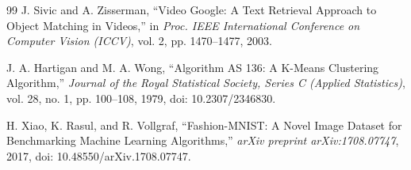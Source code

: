 \begin{thebibliography}{99}
J. Sivic and A. Zisserman,
``Video Google: A Text Retrieval Approach to Object Matching in Videos,''
in \textit{Proc. IEEE International Conference on Computer Vision (ICCV)},
vol. 2, pp. 1470--1477, 2003.

J. A. Hartigan and M. A. Wong,
``Algorithm AS 136: A K-Means Clustering Algorithm,''
\textit{Journal of the Royal Statistical Society,
Series C (Applied Statistics)},
vol. 28, no. 1, pp. 100--108, 1979,
doi: 10.2307/2346830.


H. Xiao, K. Rasul, and R. Vollgraf,
``Fashion-MNIST: A Novel Image Dataset for Benchmarking
Machine Learning Algorithms,''
\textit{arXiv preprint arXiv:1708.07747}, 2017,
doi: 10.48550/arXiv.1708.07747.


\end{thebibliography}
